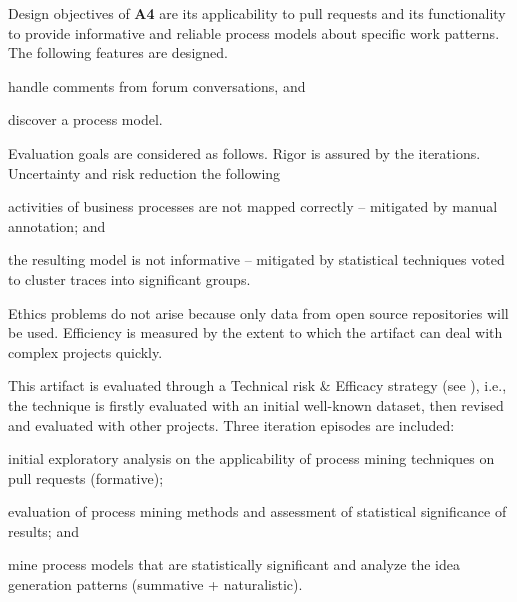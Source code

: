 \documentclass[a4paper,11pt]{article}
\begin{document}
Design objectives of \textbf{A4} are its applicability to pull requests and its functionality to provide informative and reliable process models about specific work patterns. The following features are designed.
	\begin{iiilist}
		\item handle comments from forum conversations, and
		\item discover a process model.
	\end{iiilist}
Evaluation goals are considered as follows. Rigor is assured by the iterations. Uncertainty and risk reduction the following
\begin{iiilist}
	\item activities of business processes are not mapped correctly -- mitigated by manual annotation; and
	\item the resulting model is not informative -- mitigated by statistical techniques voted to cluster traces into significant groups.
\end{iiilist} Ethics problems do not arise because only data from open source repositories will be used. Efficiency is measured by the extent to which the artifact can deal with complex projects quickly.

This artifact is evaluated through a Technical risk \& Efficacy strategy (see \cite{Venable2016}), i.e., the technique is firstly evaluated with an initial well-known dataset, then revised and evaluated with other projects. Three iteration episodes are included: 
	\begin{iiilist}
		\item initial exploratory analysis on the applicability of process mining techniques on pull requests (formative);
		\item evaluation of process mining methods and assessment of statistical significance of results; and
		\item mine process models that are statistically significant and analyze the idea generation patterns (summative + naturalistic).
	\end{iiilist}
\end{document}

